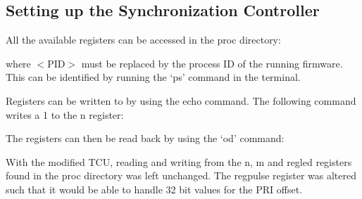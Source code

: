 \documentclass[12pt, a4paper]{article}
\begin{document}
\subsection{Setting up the Synchronization Controller}
All the available registers can be accessed in the proc directory:

	\begin{flushleft}
	\end{flushleft}

\begin{flushleft}
where $<$PID$>$ must be replaced by the process ID of the running firmware. This can be identified by running the ‘ps’ command in the terminal.
\end{flushleft}

\begin{flushleft}
Registers can be written to by using the echo command. The following command writes a 1 to the n register:

	\begin{flushleft}
	\end{flushleft}

\end{flushleft}

\begin{flushleft}
The registers can then be read back by using the ‘od’ command:

	\begin{flushleft}
		\fbox{\begin{minipage}{30em}
			od -x /proc/$<$PID$>$/hw/ioreg/n
		\end{minipage}}
	\end{flushleft}

\end{flushleft}

\begin{flushleft}
With the modified TCU, reading and writing from the n, m and reg\textunderscore led registers found in the proc directory was left unchanged. The reg\textunderscore pulse register was altered such that it would be able to handle 32 bit values for the PRI offset.
\end{flushleft}
\end{document}
